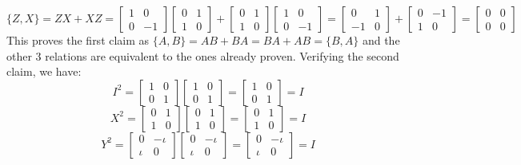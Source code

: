 \begin{example}
\[    \]
    \[
    \{Z,X\}=ZX+XZ=\begin{bmatrix} 1 & 0 \\ 0 & -1 \end{bmatrix}\begin{bmatrix} 0 & 1 \\ 1 & 0 \end{bmatrix}+\begin{bmatrix} 0 & 1 \\ 1 & 0 \end{bmatrix}\begin{bmatrix} 1 & 0 \\ 0 & -1 \end{bmatrix}=\begin{bmatrix} 0 & 1 \\ -1 & 0 \end{bmatrix}+\begin{bmatrix} 0 & -1 \\ 1 & 0 \end{bmatrix} = \begin{bmatrix} 0 & 0 \\ 0 & 0 \end{bmatrix}
    \]
    This proves the first claim as $\{A,B\}=AB+BA=BA+AB=\{B,A\}$ and the other 3 relations are equivalent to the ones already proven. Verifying the second claim, we have:
    \[
    I^2=\begin{bmatrix} 1 & 0 \\ 0 & 1\end{bmatrix}\begin{bmatrix} 1 & 0 \\ 0 & 1\end{bmatrix}=\begin{bmatrix} 1 & 0 \\ 0 & 1\end{bmatrix}=I
    \]
    \[
    X^2=\begin{bmatrix} 0 & 1 \\ 1 & 0 \end{bmatrix}\begin{bmatrix} 0 & 1 \\ 1 & 0 \end{bmatrix}=\begin{bmatrix} 0 & 1 \\ 1 & 0 \end{bmatrix}=I
    \]
    \[
    Y^2=\begin{bmatrix} 0 & -\iota \\ \iota & 0 \end{bmatrix}\begin{bmatrix} 0 & -\iota \\ \iota & 0 \end{bmatrix}=\begin{bmatrix} 0 & -\iota \\ \iota & 0 \end{bmatrix}=I
\]
\end{example}
